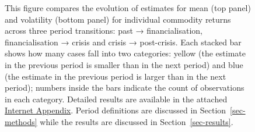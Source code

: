 \documentclass[
  authoryear,
  preprint,
  3p]{elsarticle}
\begin{document}
\begin{figure}


\caption{\label{fig-estimates}This figure compares the evolution of
estimates for mean (top panel) and volatility (bottom panel) for
individual commodity returns across three period transitions: past →
financialisation, financialisation → crisis and crisis → post-crisis.
Each stacked bar shows how many cases fall into two categories: yellow
(the estimate in the previous period is smaller than in the next period)
and blue (the estimate in the previous period is larger than in the next
period); numbers inside the bars indicate the count of observations in
each category. Detailed results are available in the attached
\href{https://bautheac.shinyapps.io/co-movement/}{Internet Appendix}.
Period definitions are discussed in Section~\ref{sec-methods} while the
results are discussed in Section~\ref{sec-results}.}

\end{figure}%
\end{document}
